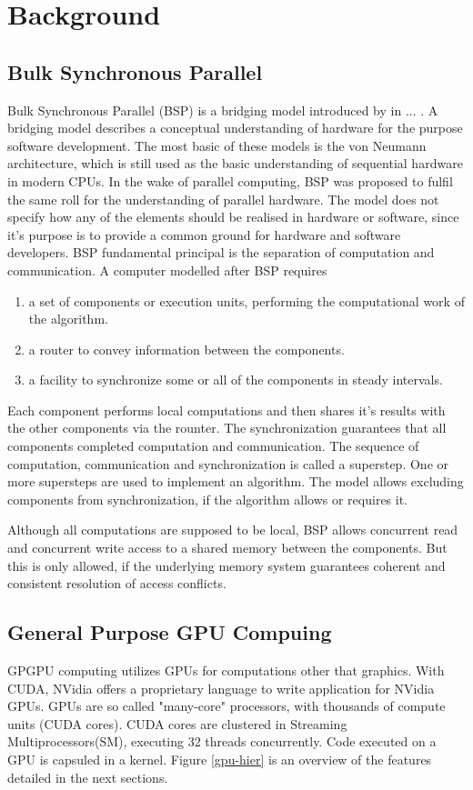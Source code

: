 \chapter{Background}
\section{Bulk Synchronous Parallel}
Bulk Synchronous Parallel (BSP) is a bridging model introduced by \cite{bsp} in ... . A bridging model describes a conceptual understanding of
hardware for the purpose software development. The most basic of these models is the von Neumann architecture, which is still used as the basic understanding of sequential hardware in modern CPUs. In the wake of parallel computing, BSP was proposed to fulfil the same roll
for the understanding of parallel hardware. The model does not specify how any of the elements should be realised in hardware or software, since it's purpose is to provide a common ground for hardware and software developers. 
BSP fundamental principal is the separation of computation and communication. A computer modelled after BSP requires
\begin{enumerate}
	\item a set of components or execution units, performing the computational work of the algorithm.
	\item a router to convey information between the components.
	\item a facility to synchronize some or all of the components in steady intervals.
\end{enumerate}
Each component performs local computations and then shares it's results with
the other components via the rounter. The synchronization guarantees that all components completed computation and communication. The sequence of computation, communication and synchronization is called a superstep. One or more supersteps are used to implement an algorithm.
The model allows excluding components from synchronization, if the algorithm allows or requires it.

Although all computations are supposed to be local, BSP allows concurrent read and concurrent write access to a shared memory between the
components. But this is only allowed, if the underlying memory system guarantees coherent and consistent resolution of access conflicts.

\section{General Purpose GPU Compuing}
GPGPU computing utilizes GPUs for computations other that graphics. With CUDA, NVidia offers a proprietary language to write application
for NVidia GPUs. GPUs are so called "many-core" processors, with thousands of compute units (CUDA cores). CUDA cores are clustered in Streaming Multiprocessors(SM), executing 32 threads concurrently. Code executed on a GPU is capsuled in a kernel. Figure \ref{gpu-hier} is an overview of the features detailed in the next sections.
